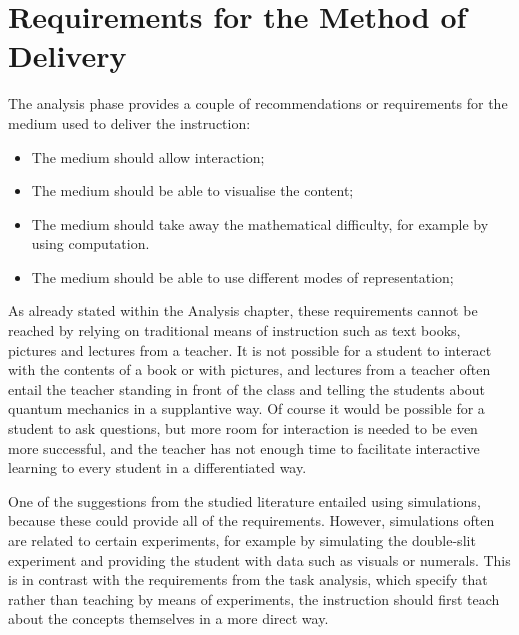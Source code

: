 \documentclass[11pt,twoside]{report} %
\begin{document}
\section{Requirements for the Method of Delivery}

The analysis phase provides a couple of recommendations or requirements for the medium used to deliver the instruction:

\begin{itemize}
\item The medium should allow interaction;
\item The medium should be able to visualise the content;
\item The medium should take away the mathematical difficulty, for example by using computation.
\item The medium should be able to use different modes of representation;
\end{itemize}

As already stated within the Analysis chapter, these requirements cannot be reached by relying on traditional means of instruction such as text books, pictures and lectures from a teacher. It is not possible for a student to interact with the contents of a book or with pictures, and lectures from a teacher often entail the teacher standing in front of the class and telling the students about quantum mechanics in a supplantive way. Of course it would be possible for a student to ask questions, but more room for interaction is needed to be even more successful, and the teacher has not enough time to facilitate interactive learning to every student in a differentiated way.

One of the suggestions from the studied literature entailed using simulations, because these could provide all of the requirements. However, simulations often are related to certain experiments, for example by simulating the double-slit experiment and providing the student with data such as visuals or numerals. This is in contrast with the requirements from the task analysis, which specify that rather than teaching by means of experiments, the instruction should first teach about the concepts themselves in a more direct way.
\end{document}
